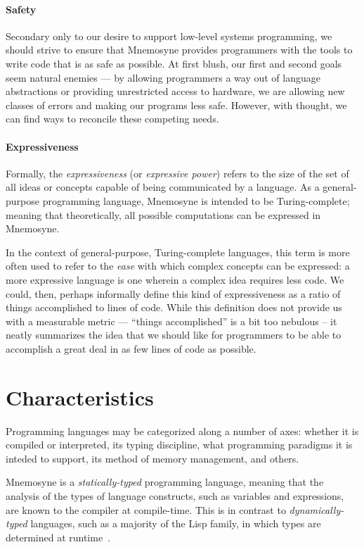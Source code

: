 \paragraph{Safety}

Secondary only to our desire to support low-level systems programming, we should strive to ensure that Mnemosyne provides programmers with the tools to write code that is as safe as possible. At first blush, our first and second goals seem natural enemies --- by allowing programmers a way out of language abstractions or providing unrestricted access to hardware, we are allowing new classes of errors and making our programs less safe. However, with thought, we can find ways to reconcile these competing needs.


\paragraph{Expressiveness}

Formally, the \textit{expressiveness} (or \textit{expressive power}) refers to the size of the set of all ideas or concepts capable of being communicated by a language. As a general-purpose programming language, Mnemosyne is intended to be Turing-complete; meaning that theoretically, all possible computations can be expressed in Mnemosyne.

In the context of general-purpose, Turing-complete languages, this term is more often used to refer to the \emph{ease} with which complex concepts can be expressed: a more expressive language is one wherein a complex idea requires less code. We could, then, perhaps informally define this kind of expressiveness as a ratio of things accomplished to lines of code. While this definition does not provide us with a measurable metric --- ``things accomplished'' is a bit too nebulous -- it neatly summarizes the idea that we should like for programmers to be able to accomplish a great deal in as few lines of code as possible.

\section{Characteristics} \label{sec:characteristics}

Programming languages may be categorized along a number of axes: whether it is compiled or interpreted, its typing discipline, what programming paradigms it is inteded to support, its method of memory management, and others.

Mnemosyne is a \textit{statically-typed} programming language, meaning that the analysis of the types of language constructs, such as variables and expressions, are known to the compiler at compile-time. This is in contrast to \textit{dynamically-typed} languages, such as a majority of the Lisp family, in which types are determined at runtime~\cite{Mitchell:2003:TT:1074100.1074885}.

